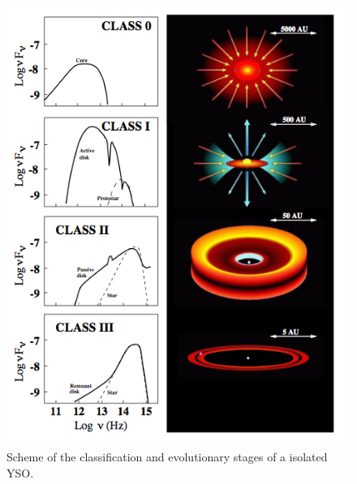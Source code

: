 \documentclass[12pt]{mythesis}
\begin{document}
\begin{figure}[h!] 
	\begin{center}
		\includegraphics[height=0.8\textheight]{figures/YSOclassification.jpg}
		\caption[YSO classification]{Scheme of the classification and evolutionary stages of a isolated YSO.}
	        \label{fig:YSOclassification}
	\end{center}
\end{figure}
\end{document}

